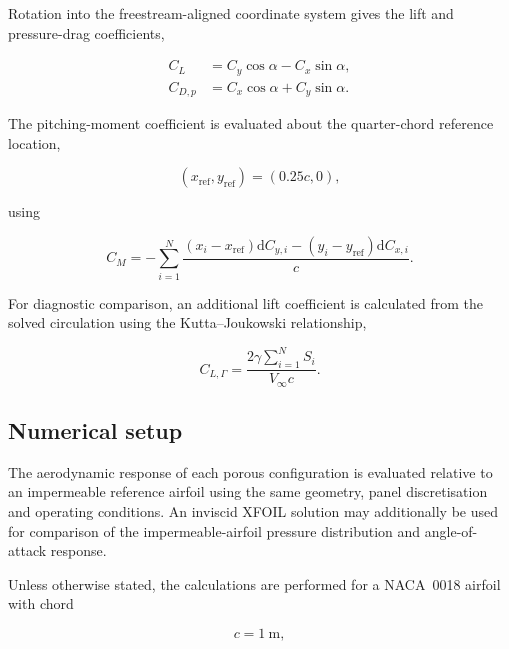 \documentclass[a4paper,fleqn]{cas-dc}
\begin{document}
Rotation into the freestream-aligned coordinate system gives the lift
and pressure-drag coefficients,

\begin{align}
	C_L
	&=
	C_y\cos\alpha
	-
	C_x\sin\alpha,
	\label{eq:cl}\\
	C_{D,p}
	&=
	C_x\cos\alpha
	+
	C_y\sin\alpha.
	\label{eq:cd}
\end{align}

The pitching-moment coefficient is evaluated about the quarter-chord
reference location,

\begin{equation}
	(x_{\mathrm{ref}},y_{\mathrm{ref}})
	=
	(0.25c,0),
\end{equation}

using

\begin{equation}
	C_M
	=
	-\sum_{i=1}^{N}
	\frac{
		(x_i-x_{\mathrm{ref}})
		\mathrm d C_{y,i}
		-
		(y_i-y_{\mathrm{ref}})
		\mathrm d C_{x,i}}
	{c}.
	\label{eq:cm}
\end{equation}

For diagnostic comparison, an additional lift coefficient is
calculated from the solved circulation using the Kutta--Joukowski
relationship,

\begin{equation}
	C_{L,\Gamma}
	=
	\frac{
		2\gamma
		\displaystyle\sum_{i=1}^{N}S_i}
	{V_{\infty}c}.
	\label{eq:kutta_joukowski_lift}
\end{equation}



\subsection{Numerical setup}
\label{subsec:numerical_setup}

The aerodynamic response of each porous configuration is evaluated
relative to an impermeable reference airfoil using the same geometry,
panel discretisation and operating conditions. An inviscid XFOIL
solution may additionally be used for comparison of the
impermeable-airfoil pressure distribution and angle-of-attack response.

Unless otherwise stated, the calculations are performed for a
NACA~0018 airfoil with chord

\begin{equation}
	c
	=
	1~\mathrm{m},
\end{equation}
\end{document}
